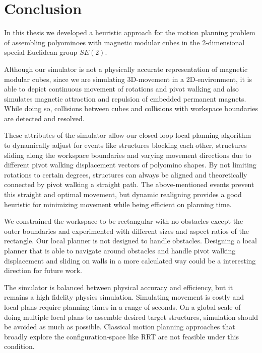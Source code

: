 \chapter{Conclusion}
\label{chap:conclusion}

In this thesis we developed a heuristic approach for the motion planning problem of assembling polyominoes with magnetic modular cubes \cite{Bhattacharjee2022} in the 2-dimensional special Euclidean group $\textit{SE}(2)$.

Although our simulator is not a physically accurate representation of magnetic modular cubes, since we are simulating 3D-movement in a 2D-environment, it is able to depict continuous movement of rotations and pivot walking and also simulates magnetic attraction and repulsion of embedded permanent magnets.
While doing so, collisions between cubes and collisions with workspace boundaries are detected and resolved.

These attributes of the simulator allow our closed-loop local planning algorithm to dynamically adjust for events like structures blocking each other, structures sliding along the workspace boundaries and varying movement directions due to different pivot walking displacement vectors of polyomino shapes.
By not limiting rotations to certain degrees, structures can always be aligned and theoretically connected by pivot walking a straight path.
The above-mentioned events prevent this straight and optimal movement, but dynamic realigning provides a good heuristic for minimizing movement while being efficient on planning time.

We constrained the workspace to be rectangular with no obstacles except the outer boundaries and experimented with different sizes and aspect ratios of the rectangle.
Our local planner is not designed to handle obstacles.
Designing a local planner that is able to navigate around obstacles and handle pivot walking displacement and sliding on walls in a more calculated way could be a interesting direction for future work.

The simulator is balanced between physical accuracy and efficiency, but it remains a high fidelity physics simulation.
Simulating movement is costly and local plans require planning times in a range of seconds.
On a global scale of doing multiple local plans to assemble desired target structures, simulation should be avoided as much as possible.
Classical motion planning approaches that broadly explore the configuration-space like RRT are not feasible under this condition.

